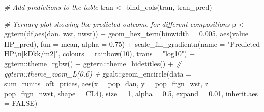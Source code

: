 \documentclass[
  12pt,
]{article}
\newenvironment{Shaded}{\begin{snugshade}}{\end{snugshade}}
\newcommand{\AttributeTok}[1]{\textcolor[rgb]{0.77,0.63,0.00}{#1}}
\newcommand{\CommentTok}[1]{\textcolor[rgb]{0.56,0.35,0.01}{\textit{#1}}}
\newcommand{\ConstantTok}[1]{\textcolor[rgb]{0.00,0.00,0.00}{#1}}
\newcommand{\DecValTok}[1]{\textcolor[rgb]{0.00,0.00,0.81}{#1}}
\newcommand{\FloatTok}[1]{\textcolor[rgb]{0.00,0.00,0.81}{#1}}
\newcommand{\FunctionTok}[1]{\textcolor[rgb]{0.00,0.00,0.00}{#1}}
\newcommand{\NormalTok}[1]{#1}
\newcommand{\OtherTok}[1]{\textcolor[rgb]{0.56,0.35,0.01}{#1}}
\newcommand{\SpecialCharTok}[1]{\textcolor[rgb]{0.00,0.00,0.00}{#1}}
\newcommand{\StringTok}[1]{\textcolor[rgb]{0.31,0.60,0.02}{#1}}
\begin{document}
\begin{Shaded}
\begin{Highlighting}[]
\CommentTok{\# Add predictions to the table}
\NormalTok{tran }\OtherTok{\textless{}{-}} \FunctionTok{bind\_cols}\NormalTok{(tran, tran\_pred) }
\end{Highlighting}
\end{Shaded}

\begin{Shaded}
\begin{Highlighting}[]
\CommentTok{\# Ternary plot showing the predicted outcome for different compositions}
\NormalTok{p }\OtherTok{\textless{}{-}} \FunctionTok{ggtern}\NormalTok{(df,}\FunctionTok{aes}\NormalTok{(dan, wst, nwst)) }\SpecialCharTok{+} 
  \FunctionTok{geom\_hex\_tern}\NormalTok{(}\AttributeTok{binwidth  =} \FloatTok{0.005}\NormalTok{, }
                \FunctionTok{aes}\NormalTok{(}\AttributeTok{value =}\NormalTok{ HP\_pred),}
                \AttributeTok{fun =}\NormalTok{ mean,}
                \AttributeTok{alpha =} \FloatTok{0.75}\NormalTok{) }\SpecialCharTok{+}
  \FunctionTok{scale\_fill\_gradientn}\NormalTok{(}\AttributeTok{name =} \StringTok{"Predicted HP}\SpecialCharTok{\textbackslash{}n}\StringTok{[kDkk/m2]"}\NormalTok{,}
                       \AttributeTok{colours =} \FunctionTok{rainbow}\NormalTok{(}\DecValTok{10}\NormalTok{), }
                       \AttributeTok{trans =} \StringTok{"log10"}\NormalTok{) }\SpecialCharTok{+}
\NormalTok{  ggtern}\SpecialCharTok{::}\FunctionTok{theme\_rgbw}\NormalTok{() }\SpecialCharTok{+}
\NormalTok{  ggtern}\SpecialCharTok{::}\FunctionTok{theme\_hidetitles}\NormalTok{() }\SpecialCharTok{+}
  \CommentTok{\# ggtern::theme\_zoom\_L(0.6) +}
\NormalTok{  ggalt}\SpecialCharTok{::}\FunctionTok{geom\_encircle}\NormalTok{(}\AttributeTok{data =}\NormalTok{ sum\_runits\_oft\_prices,}
                       \FunctionTok{aes}\NormalTok{(}\AttributeTok{x =}\NormalTok{ pop\_dan,}
                           \AttributeTok{y =}\NormalTok{ pop\_frgn\_wst,}
                           \AttributeTok{z =}\NormalTok{ pop\_frgn\_nwst,}
                           \AttributeTok{shape =}\NormalTok{ CL4),}
                       \AttributeTok{size =} \DecValTok{1}\NormalTok{,}
                       \AttributeTok{alpha =} \FloatTok{0.5}\NormalTok{,}
                       \AttributeTok{expand =} \FloatTok{0.01}\NormalTok{,}
                       \AttributeTok{inherit.aes =} \ConstantTok{FALSE}\NormalTok{) }


\end{Highlighting}
\end{Shaded}
\end{document}

